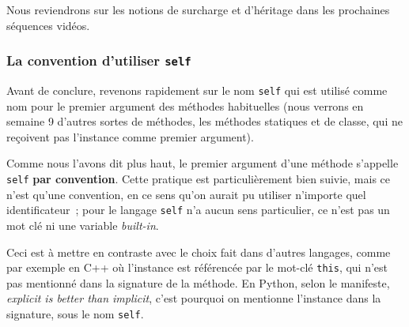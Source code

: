     Nous reviendrons sur les notions de surcharge et d'héritage dans les
prochaines séquences vidéos.

    \hypertarget{la-convention-dutiliser-self}{%
\subsubsection{\texorpdfstring{La convention d'utiliser
\texttt{self}}{La convention d'utiliser self}}\label{la-convention-dutiliser-self}}

    Avant de conclure, revenons rapidement sur le nom \texttt{self} qui est
utilisé comme nom pour le premier argument des méthodes habituelles
(nous verrons en semaine 9 d'autres sortes de méthodes, les méthodes
statiques et de classe, qui ne reçoivent pas l'instance comme premier
argument).

Comme nous l'avons dit plus haut, le premier argument d'une méthode
s'appelle \texttt{self} \textbf{par convention}. Cette pratique est
particulièrement bien suivie, mais ce n'est qu'une convention, en ce
sens qu'on aurait pu utiliser n'importe quel identificateur~; pour le
langage \texttt{self} n'a aucun sens particulier, ce n'est pas un mot
clé ni une variable \emph{built-in}.

    Ceci est à mettre en contraste avec le choix fait dans d'autres
langages, comme par exemple en C++ où l'instance est référencée par le
mot-clé \texttt{this}, qui n'est pas mentionné dans la signature de la
méthode. En Python, selon le manifeste, \emph{explicit is better than
implicit}, c'est pourquoi on mentionne l'instance dans la signature,
sous le nom \texttt{self}.


    
    
    
